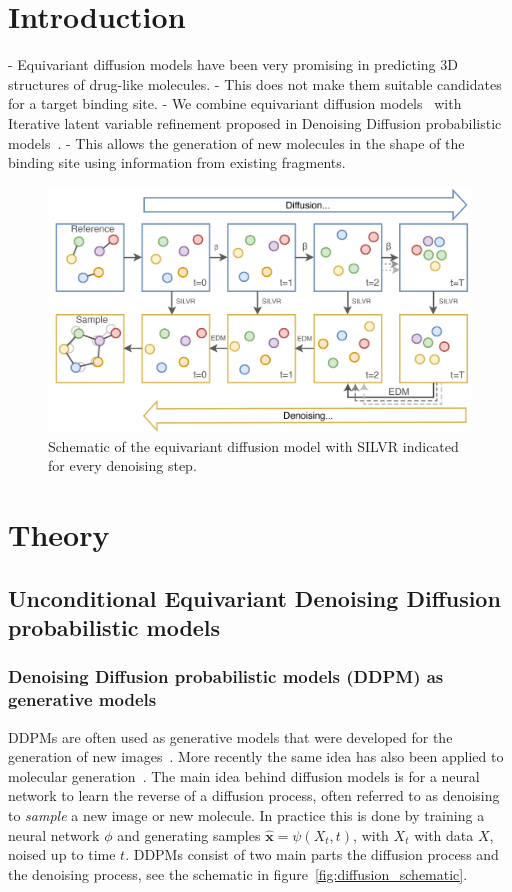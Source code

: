 \documentclass[journal=jacsat,manuscript=article]{achemso}
\begin{document}
\section{Introduction}
\label{sec:intro}
- Equivariant diffusion models have been very promising in predicting 3D structures of drug-like molecules. 
- This does not make them suitable candidates for a target binding site. 
- We combine equivariant diffusion models~\cite{huang2022mdm} with Iterative latent variable refinement proposed in Denoising Diffusion probabilistic models~\cite{choi2021ilvr}.
- This allows the generation of new molecules in the shape of the binding site using information from existing fragments.
\begin{figure}
    \centering
    \includegraphics[width=\textwidth]{paper/Figures/Fig1/Schematic.png}
    \caption{Schematic of the equivariant diffusion model with  SILVR indicated for every denoising step.}
    \label{fig:schematic}
\end{figure}
\section{Theory}
\label{sec:theory}
\subsection{Unconditional Equivariant Denoising Diffusion probabilistic models}
\subsubsection*{Denoising Diffusion probabilistic models (DDPM) as generative models}
DDPMs are often used as generative models that were developed for the generation of new images~\cite{}. More recently the same idea has also been applied to molecular generation~\cite{}. The main idea behind diffusion models is for a neural network to learn the reverse of a diffusion process, often referred to as denoising to \textit{sample} a new image or new molecule. In practice this is done by training a neural network $\phi$ and generating samples $\hat{\mathbf{x}}=\psi(X_t,t)$, with $X_t$ with data $X$, noised up to time $t$.  DDPMs consist of two main parts the diffusion process and the denoising process, see the schematic in figure~\ref{fig:diffusion_schematic}.
\end{document}
